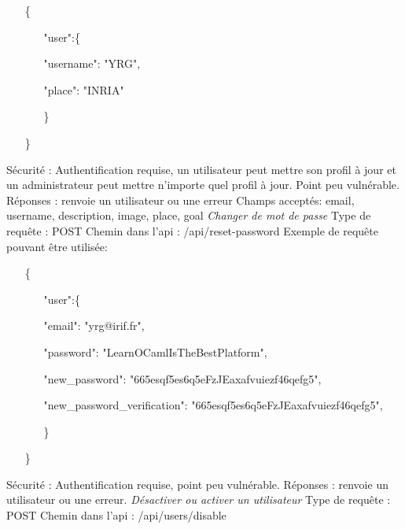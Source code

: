 \documentclass{article}
\begin{document}
\begin{itemize}
	\item[\{]
	\begin{itemize}
		\item[]
		\item["user":\{]
		\item[]"username": "YRG",
		\item[]"place": "INRIA"
		\item[\}]
	\end{itemize}
	\item[\}]
\end{itemize}
Sécurité : Authentification requise, un utilisateur peut mettre son profil à jour et un administrateur peut mettre n'importe quel profil à jour. Point peu vulnérable.
\newline
Réponses : renvoie un utilisateur ou une erreur
\newline
Champs acceptés: email, username, description, image, place, goal
\newpage
\textit{Changer de mot de passe}
\newline
Type de requête : POST
\newline
Chemin dans l'api : /api/reset-password
\newline
Exemple de requête pouvant être utilisée:
\begin{itemize}
	\item[\{]
	\begin{itemize}
		\item[]
		\item["user":\{]
		\item[]"email": "yrg@irif.fr",
		\item[]"password": "LearnOCamlIsTheBestPlatform",
		\item[]"new\_password": "665esqf5es6q5eFzJEaxafvuiezf46qefg5",
		\item[]"new\_password\_verification": "665esqf5es6q5eFzJEaxafvuiezf46qefg5",
		\item[\}]
	\end{itemize}
	\item[\}]
\end{itemize}
Sécurité : Authentification requise, point peu vulnérable.
\newline
Réponses : renvoie un utilisateur ou une erreur.
\newline
\newline
\textit{Désactiver ou activer un utilisateur}
\newline
Type de requête : POST
\newline
Chemin dans l'api : /api/users/disable
\end{document}
